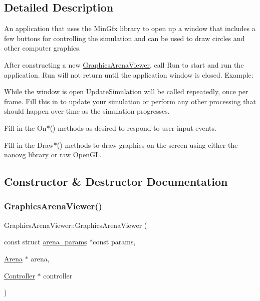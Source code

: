 \subsection{Detailed Description}
An application that uses the Min\+Gfx library to open up a window that includes a few buttons for controlling the simulation and can be used to draw circles and other computer graphics. 

After constructing a new \mbox{\hyperlink{class_graphics_arena_viewer}{Graphics\+Arena\+Viewer}}, call Run to start and run the application. Run will not return until the application window is closed. Example\+:


\begin{DoxyCode}
\DoxyCodeLine{\}}
\end{DoxyCode}


While the window is open Update\+Simulation will be called repeatedly, once per frame. Fill this in to update your simulation or perform any other processing that should happen over time as the simulation progresses.

Fill in the {\ttfamily On$\ast$()} methods as desired to respond to user input events.

Fill in the {\ttfamily Draw$\ast$()} methods to draw graphics on the screen using either the {\ttfamily nanovg} library or raw {\ttfamily Open\+GL}. 

\subsection{Constructor \& Destructor Documentation}
\mbox{\label{class_graphics_arena_viewer_a869510833897508300da65b1eb0c5d09}} 
\subsubsection{\texorpdfstring{Graphics\+Arena\+Viewer()}{GraphicsArenaViewer()}}
{\footnotesize\ttfamily Graphics\+Arena\+Viewer\+::\+Graphics\+Arena\+Viewer (\begin{DoxyParamCaption}\item[{const struct \mbox{\hyperlink{structarena__params}{arena\+\_\+params}} $\ast$const}]{params,  }\item[{\mbox{\hyperlink{class_arena}{Arena}} $\ast$}]{arena,  }\item[{\mbox{\hyperlink{class_controller}{Controller}} $\ast$}]{controller }\end{DoxyParamCaption})\hspace{0.3cm}{\ttfamily [explicit]}}



